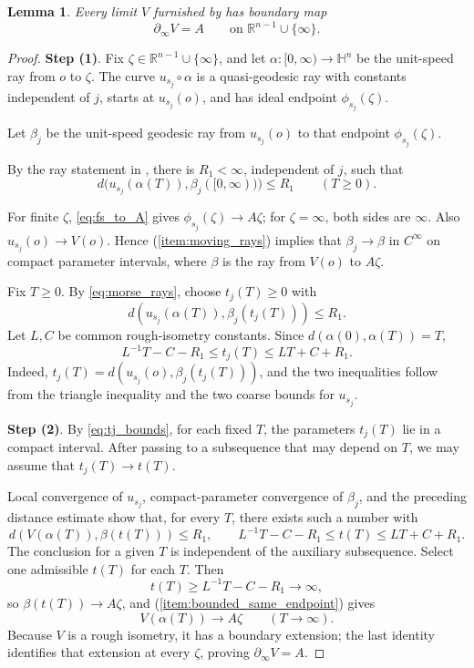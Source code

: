 \documentclass[11pt]{amsart}
\newcommand{\SuggestedDelete}[1]{{\hypersetup{linkcolor=red,citecolor=red,urlcolor=red}\color{red}#1}}
\newcommand{\ReviewUnusedLabel}[1]{%
  \par\noindent
  \SuggestedDelete{\textup{\scriptsize Unused label: \texttt{\detokenize{\label{#1}}}}}%
  \par}
\theoremstyle{plain}
\newtheorem{lemma}[theorem]{Lemma}
\theoremstyle{plain}
\theoremstyle{plain}
\newcommand{\Hn}{\mathbb H^n}
\newcommand{\bdry}{\partial_\infty}
\newcommand{\R}{\mathbb R}
\numberwithin{equation}{section}
\begin{document}


\begin{lemma}\label{lem:boundary_V}
Every limit \(V\) furnished by  has boundary map
\[
\bdry V=A
\qquad\text{on }\R^{n-1}\cup\{\infty\}.
\]
\end{lemma}

\begin{proof}
\textbf{Step (1)}. Fix \(\zeta\in\R^{n-1}\cup\{\infty\}\), and let
\(\alpha:[0,\infty)\to\Hn\) be the unit-speed ray from \(o\) to
\(\zeta\).  The curve \(u_{s_j}\circ\alpha\) is a quasi-geodesic ray with constants independent of \(j\), starts at \(u_{s_j}(o)\), and has ideal endpoint \(\phi_{s_j}(\zeta)\).  

Let \(\beta_j\) be the unit-speed
geodesic ray from \(u_{s_j}(o)\) to that endpoint \(\phi_{s_j}(\zeta)\).

By the ray statement in , there is
\(R_1<\infty\), independent of \(j\), such that
\begin{equation}\label{eq:morse_rays}
d\bigl(u_{s_j}(\alpha(T)),\beta_j([0,\infty))\bigr)\leq R_1
\qquad(T\geq0).
\end{equation}

For finite \(\zeta\), \eqref{eq:fs_to_A} gives
\(\phi_{s_j}(\zeta)\to A\zeta\); for \(\zeta=\infty\), both sides are
\(\infty\).  Also \(u_{s_j}(o)\to V(o)\).  Hence
(\ref{item:moving_rays}) implies that
\(\beta_j\to\beta\) in \(C^\infty\) on compact parameter intervals,
where \(\beta\) is the ray from \(V(o)\) to \(A\zeta\).

Fix \(T\geq0\).  By \eqref{eq:morse_rays}, choose \(t_j(T)\geq0\) with
\[
d(u_{s_j}(\alpha(T)),\beta_j(t_j(T)))\leq R_1.
\]
Let \(L,C\) be common rough-isometry constants.  Since
\(d(\alpha(0),\alpha(T))=T\),
\begin{equation}\label{eq:tj_bounds}
L^{-1}T-C-R_1
\leq t_j(T)
\leq LT+C+R_1.
\end{equation}
Indeed, \(t_j(T)=d(u_{s_j}(o),\beta_j(t_j(T)))\), and the two inequalities
follow from the triangle inequality and the two coarse bounds for
\(u_{s_j}\).

\textbf{Step (2)}. By \eqref{eq:tj_bounds}, for each fixed
\(T\), the parameters \(t_j(T)\) lie in a compact interval.  After passing to a subsequence that may depend on \(T\), we may assume that \(t_j(T)\to t(T)\).

Local convergence of
\(u_{s_j}\), compact-parameter convergence of \(\beta_j\), and the
preceding distance estimate show that, for every \(T\), there exists such a
number with
\[
d(V(\alpha(T)),\beta(t(T)))\leq R_1,
\qquad
L^{-1}T-C-R_1\leq t(T)\leq LT+C+R_1.
\]
The conclusion for a given \(T\) is independent of the auxiliary
subsequence.  Select one admissible \(t(T)\) for each \(T\).  Then
\[
t(T)\geq L^{-1}T-C-R_1\longrightarrow\infty,
\]
so \(\beta(t(T))\to A\zeta\), and
(\ref{item:bounded_same_endpoint}) gives
\[
V(\alpha(T))\longrightarrow A\zeta
\qquad(T\to\infty).
\]
Because \(V\) is a rough isometry, it has a boundary extension; the last
identity identifies that extension at every \(\zeta\), proving
\(\bdry V=A\).
\end{proof}
\end{document}

